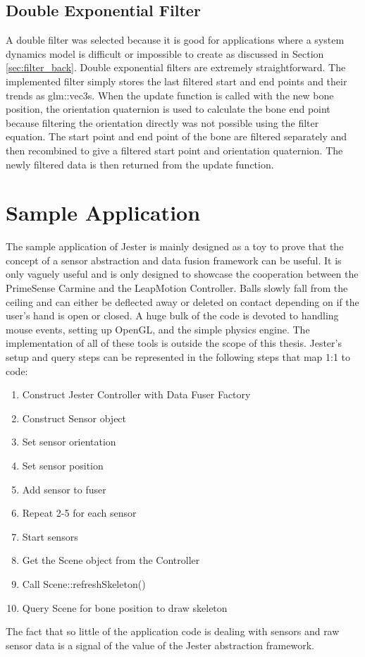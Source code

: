 \subsection{Double Exponential Filter}\label{sec:filter_impl}

A double filter was selected because it is good for applications where a system dynamics model is difficult or impossible to create as discussed in Section \ref{sec:filter_back}. Double exponential filters are extremely straightforward. The implemented filter simply stores the last filtered start and end points and their trends as glm::vec3s. When the update function is called with the new bone position, the orientation quaternion is used to calculate the bone end point because filtering the orientation directly was not possible using the filter equation. The start point and end point of the bone are filtered separately and then recombined to give a filtered start point and orientation quaternion. The newly filtered data is then returned from the update function.

\section{Sample Application}\label{sec:app_impl}

The sample application of Jester is mainly designed as a toy to prove that the concept of a sensor abstraction and data fusion framework can be useful. It is only vaguely useful and is only designed to showcase the cooperation between the PrimeSense Carmine and the LeapMotion Controller. Balls slowly fall from the ceiling and can either be deflected away or deleted on contact depending on if the user's hand is open or closed. A huge bulk of the code is devoted to handling mouse events, setting up OpenGL, and the simple physics engine. The implementation of all of these tools is outside the scope of this thesis. Jester's setup and query steps can be represented in the following steps that map 1:1 to code:

\begin{enumerate}
  \item Construct Jester Controller with Data Fuser Factory
  \item Construct Sensor object
  \item Set sensor orientation
  \item Set sensor position
  \item Add sensor to fuser
  \item Repeat 2-5 for each sensor
  \item Start sensors
  \item Get the Scene object from the Controller
  \item Call Scene::refreshSkeleton()
  \item Query Scene for bone position to draw skeleton
\end{enumerate}

The fact that so little of the application code is dealing with sensors and raw sensor data is a signal of the value of the Jester abstraction framework.
